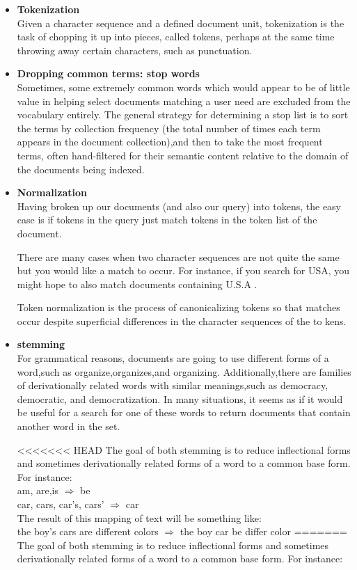 \begin{itemize}
     \item \textbf{Tokenization}\\
     Given a character sequence and a defined document unit, tokenization is the
     task of chopping it up into pieces, called tokens, perhaps at the same time
     throwing away certain characters, such as punctuation.
     
     
     \item \textbf{Dropping common terms: stop words}\\
     Sometimes, some extremely common words which would appear to be of
     little value in helping select documents matching a user need are excluded
     from the vocabulary entirely.
     The general strategy for determining a stop list is to sort the terms by collection frequency (the total number of times each term appears in the document collection),and then to take the most frequent terms, often hand-filtered for their semantic content relative to the domain of the documents being indexed.
     
     
     \item  \textbf{Normalization}\\ 
     Having broken up our documents (and also our query) into tokens, the easy
     case is if tokens in the query just match tokens in the token list of the document.
     
     There are many cases when two character sequences are not quite the same but you would like a match to occur. For instance, if you search for USA, you might hope to also match documents containing U.S.A .
     
     Token normalization is the process of canonicalizing tokens so that matches occur despite superficial differences in the character sequences of the to kens.
    
    \item  \textbf{stemming}\\
    For grammatical reasons, documents are going to use different forms of a word,such as organize,organizes,and organizing. Additionally,there are families of derivationally related words with similar meanings,such as democracy, democratic, and democratization. In many situations, it seems as if it would be useful for a search for one of these words to return documents that contain another word in the set.
    
<<<<<<< HEAD
    The goal of both stemming is to reduce inflectional forms and sometimes derivationally related forms of a word to a common base form.
    For instance:\\
    am, are,is $\Rightarrow$  be \\
    car, cars, car's, cars' $\Rightarrow$  car \\
    The result of this mapping of text will be something like:\\
    the boy's cars are different colors  $\Rightarrow$   the  boy  car  be  differ   color
=======
    The goal of both stemming is to reduce inﬂectional forms and sometimes derivationally related forms of a word to a common base form.
    For instance:
    

\end{itemize}
